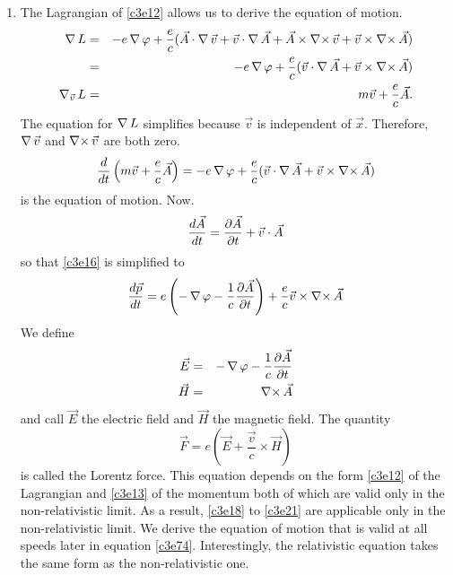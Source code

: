 \begin{enumerate}
\item The Lagrangian of \eqref{c3e12} allows us to derive the equation of motion.
\begin{eqnarray*}
\operatorname{\nabla} L &=& -e\operatorname{\nabla}\varphi + \frac{e}{c}(\vec{A}\cdot\operatorname{\nabla}\vec{v} + 
 \vec{v}\cdot\operatorname{\nabla}\vec{A} + \vec{A}\times\operatorname{\nabla\times}\vec{v} + \vec{v}\times\operatorname{\nabla\times}\vec{A})\\ 
 &=& -e\operatorname{\nabla}\varphi + \frac{e}{c}(\vec{v}\cdot\operatorname{\nabla}\vec{A} + \vec{v}\times\operatorname{\nabla\times}\vec{A})\\ 
\operatorname{\nabla}_{\vec{v}}L &=& m\vec{v} + \frac{e}{c}\vec{A}.
\end{eqnarray*}
The equation for $\operatorname{\nabla} L$ simplifies because $\vec{v}$ is independent of $\vec{x}$.
Therefore, $\operatorname{\nabla}\vec{v}$ and $\operatorname{\nabla\times}\vec{v}$ are both zero.
\begin{equation}\label{c3e16}
\frac{d}{dt}\left(m\vec{v} + \frac{e}{c}\vec{A}\right) = 
-e\operatorname{\nabla}\varphi + \frac{e}{c}(\vec{v}\cdot\operatorname{\nabla}\vec{A} + \vec{v}\times\operatorname{\nabla\times}\vec{A})
\end{equation}
is the equation of motion. Now.
\begin{equation}\label{c3e17}
\frac{d{\vec{A}}}{d{t}} = \frac{\partial{\vec{A}}}{\partial{t}} + \vec{v}\cdot\vec{A}
\end{equation}
so that \eqref{c3e16} is simplified to
\begin{equation}\label{c3e18}
\frac{d{\vec{p}}}{d{t}} = e\left(-\operatorname{\nabla}\varphi - \frac{1}{c}\frac{\partial{\vec{A}}}{\partial{t}}\right)
+ \frac{e}{c}\vec{v}\times\operatorname{\nabla\times}\vec{A}
\end{equation}
We define
\begin{eqnarray}
\vec{E} &=& -\operatorname{\nabla}\varphi - \frac{1}{c}\frac{\partial{\vec{A}}}{\partial{t}} \label{c3e19} \\
\vec{H} &=& \operatorname{\nabla\times}\vec{A} \label{c3e20}
\end{eqnarray}
and call $\vec{E}$ the electric field and $\vec{H}$ the magnetic field. The
quantity
\begin{equation}\label{c3e21}
\vec{F} = e\left(\vec{E} + \frac{\vec{v}}{c}\times\vec{H}\right)
\end{equation}
is called the Lorentz force. This equation depends on the form \eqref{c3e12} of
the Lagrangian and \eqref{c3e13} of the momentum both of which are valid only in
the non-relativistic limit. As a result, \eqref{c3e18} to \eqref{c3e21} are 
applicable only in the non-relativistic limit. We derive the equation of motion
that is valid at all speeds later in equation \eqref{c3e74}. Interestingly, the
relativistic equation takes the same form as the non-relativistic one.


\end{enumerate}
